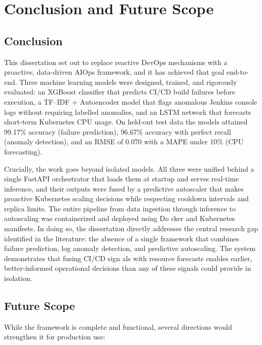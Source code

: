 \documentclass[12pt]{report}
\begin{document}
\clearpage
\chapter{Conclusion and Future Scope}

\section{Conclusion}

This dissertation set out to replace reactive DevOps mechanisms with a proactive, data-driven AIOps framework, and it has achieved that goal end-to-end. Three machine learning models were designed, trained, and rigorously evaluated: an XGBoost classifier that predicts CI/CD build failures before execution, a TF--IDF + Autoencoder model that flags anomalous Jenkins console logs without requiring labelled anomalies, and an LSTM network that forecasts short-term Kubernetes CPU usage. On held-out test data the models attained 99.17\% accuracy (failure prediction), 96.67\% accuracy with perfect recall (anomaly detection), and an RMSE of 0.070 with a MAPE under 10\% (CPU forecasting).

Crucially, the work goes beyond isolated models. All three were unified behind a single FastAPI orchestrator that loads them at startup and serves real-time inference, and their outputs were fused by a predictive autoscaler that makes proactive Kubernetes scaling decisions while respecting cooldown
intervals and replica limits. The entire pipeline from data ingestion through inference to autoscaling  was containerized and deployed using Do
cker and Kubernetes manifests. In doing so, the dissertation directly addresses the central research gap identified in the literature: the absence of
a single framework that combines failure prediction, log anomaly detection, and predictive autoscaling. The system demonstrates that fusing CI/CD sign
als with resource forecasts enables earlier, better-informed operational decisions than any of these signals could provide in isolation.

\section{Future Scope}

While the framework is complete and functional, several directions would strengthen it for production use:
\end{document}

